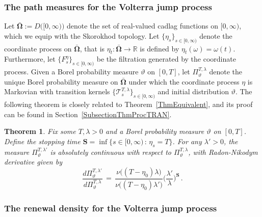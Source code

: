 \documentclass[10pt]{article}
\numberwithin{equation}{section}
\newtheorem{theorem}{Theorem}[section]
\theoremstyle{definition}
\newcommand{\R}{{\mathbb R}}
\begin{document}
\subsubsection{The path measures for the Volterra jump process}\label{SubsubsectionNuPathMeasure}

Let $ \boldsymbol{\bar{\Omega}} :=D\big([0,\infty)\big) $ denote the set of real-valued cadlag  functions on $[0,\infty)$, which we equip with the Skorokhod topology.  Let $\{\eta_s\}_{s\in [0,\infty) }$ denote the coordinate process on $ \boldsymbol{\bar{\Omega}}$, that is $\eta_t: \boldsymbol{\bar{\Omega}}\rightarrow \R$ is defined by $\eta_t(\omega)=\omega(t)$.  Furthermore,  let $\{F_s^{\eta}\}_{s\in [0,\infty)}$ be the filtration generated by the coordinate process.   Given a Borel probability measure $\vartheta$ on $[0,T]$, let $\Pi^{T,\lambda}_{\vartheta}$ denote the unique Borel probability measure  on $  \boldsymbol{\bar{\Omega}}$ under which the coordinate process $\eta$  is Markovian with transition kernels  $\{ \mathscr{T}^{T,\lambda}_s\}_{s\in [0,\infty)}  $ and  initial distribution $\vartheta$. The following theorem is  closely related to Theorem~\ref{ThmEquivalent}, and  its proof can be found in Section~\ref{SubsectionThmProcTRAN}.
\begin{theorem}\label{ThmProcTRAN} Fix some $T,\lambda>0$ and  a Borel probability measure $\vartheta$  on $ [0,T]$.  Define the stopping time $\mathbf{S}=\inf\{ s\in [0,\infty)\,:\, \eta_s=T \}$.  For any $\lambda' >0$, the measure $\Pi^{T,\lambda'}_{\vartheta}$ is absolutely continuous with respect to $\Pi^{T,\lambda}_{\vartheta}$, with Radon-Nikodym derivative given by
$$   \frac{ d\Pi^{T,\lambda'}_{\vartheta}  }{ d\Pi^{T,\lambda}_{\vartheta}  }\,=\,  
 \frac{ \nu\big((T-\eta_0) \lambda    \big) }{ \nu\big((T-\eta_0)\lambda'   \big)  }  \bigg(\frac{\lambda'}{\lambda}\bigg)^{\mathbf{S}  }  \,.    $$
\end{theorem}





 \subsubsection{The renewal density for the Volterra jump process}\label{SubsectionRenewal}
\end{document}
